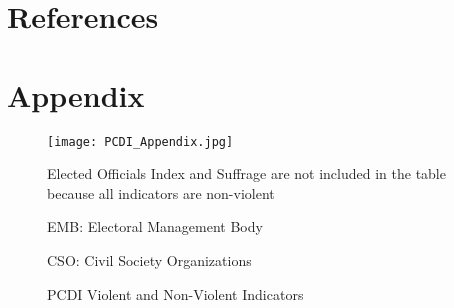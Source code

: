 \documentclass [11pt]{article}
\begin{document}
\section*{References} 

\begin{hangparas}{1cm}{1}

\end{hangparas}

\section*{Appendix}

\begin{figure} [h!]

\caption{PCDI Violent and Non-Violent Indicators}
\begin{center} 
\small
 \texttt{[image: PCDI\_Appendix.jpg]}
 
{\footnotesize Elected Officials Index and Suffrage are not included in the table because all indicators are non-violent}

{\footnotesize EMB: Electoral Management Body}
 
{\footnotesize CSO: Civil Society Organizations}
 
\end{center}
\end{figure}
\end{document}
